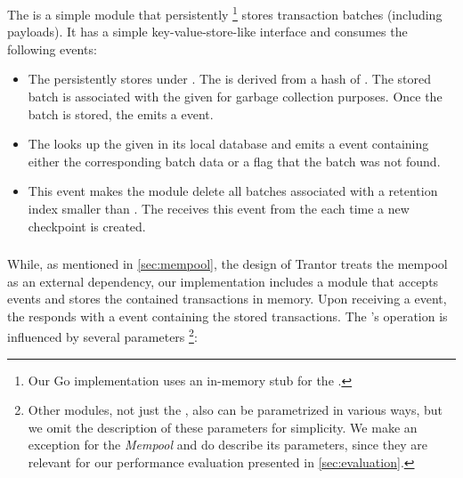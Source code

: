 \documentclass{article}
\begin{document}
\subsubsection{}

The  is a simple module that persistently%
\footnote{Our Go implementation uses an in-memory stub for the .}
stores transaction batches (including payloads).
It has a simple key-value-store-like interface and consumes the following events:

\begin{itemize}
    \item {}
    The  persistently stores  under .
    The  is derived from a hash of .
    The stored batch is associated with the given  for garbage collection purposes.
    Once the batch is stored, the  emits a  event.

    \item {}
    The  looks up the given  in its local database and emits a  event
    containing either the corresponding batch data or a flag that the batch was not found.
    
    \item {}
    This event makes the  module delete all batches associated with a retention index smaller than .
    The  receives this event from the  each time a new checkpoint is created.
    
\end{itemize}

\subsubsection{}
\label{sec:module-mempool}

While, as mentioned in \cref{sec:mempool}, the design of Trantor treats the mempool as an external dependency,
our implementation includes a  module that accepts  events and stores the contained transactions in memory.
Upon receiving a  event, the  responds with a  event containing the stored transactions.
The 's operation is influenced by several parameters%
\footnote{Other modules, not just the , also can be parametrized in various ways, but we omit the description of these parameters for simplicity.
We make an exception for the \emph{Mempool} and do describe its parameters, since they are relevant for our performance evaluation presented in \cref{sec:evaluation}.}:
\end{document}
